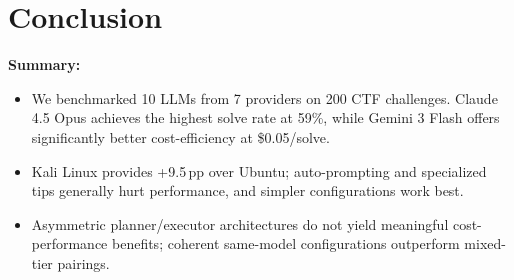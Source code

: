 \documentclass[conference]{IEEEtran}
\begin{document}
% 
% 
% 
% 


\section{Conclusion}

\noindent\textbf{Summary:}
\begin{itemize}
  \item We benchmarked 10 LLMs from 7 providers on 200 CTF challenges. Claude 4.5 Opus achieves the highest solve rate at 59\%, while Gemini 3 Flash offers significantly better cost-efficiency at \$0.05/solve.
  \item Kali Linux provides +9.5\,pp over Ubuntu; auto-prompting and specialized tips generally hurt performance, and simpler configurations work best.
  \item Asymmetric planner/executor architectures do not yield meaningful cost-performance benefits; coherent same-model configurations outperform mixed-tier pairings.
\end{itemize}
\end{document}
